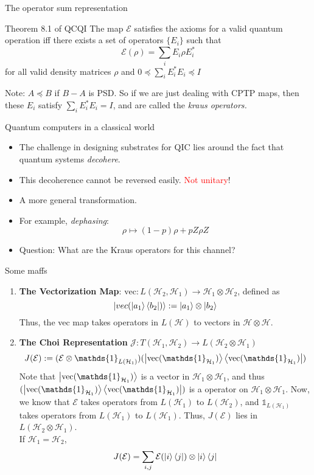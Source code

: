 \documentclass[handout]{beamer}
\renewcommand{\vec}{\text{vec}}
\newcommand{\iden}{\mathds{1}}
\newcommand{\Hilb}{\mathcal{H}}
\newcommand{\E}{\mathcal{E}}
\newcommand{\J}{\mathcal{J}}
\begin{document}
\begin{frame}{The operator sum representation}
    \begin{block}{Theorem 8.1 of QCQI}
    The map $\E$ satisfies the axioms for a valid quantum operation iff there exists a set of operators $\{E_i\}$ such that  \[\E(\rho) = \sum_iE_i\rho E_i^*\]
for all valid density matrices $\rho$ and $0 \preccurlyeq\sum_iE_i^*E_i \preccurlyeq I$
    \end{block}
     Note: $A\preccurlyeq B$ if $B-A$ is PSD.
\pause
So if we are just dealing with CPTP maps, then these $E_i$ satisfy $\sum_iE_i^*E_i = I$, and are called the \textit{kraus operators.}
\end{frame}

\begin{frame}{Quantum computers in a classical world}
    \begin{itemize}
        \item The challenge in designing substrates for QIC lies around the fact that quantum systems \textit{decohere}.\pause 
        \item This decoherence cannot be reversed easily. \textcolor{red}{Not unitary}!\pause 
        \item A more general transformation. \pause 
        \item For example, \textit{dephasing}:
        \begin{equation}
            \rho \mapsto (1-p)\rho + pZ\rho Z
        \end{equation}\pause 
        \item Question: What are the Kraus operators for this channel?
    \end{itemize}
\end{frame}
\begin{frame}{Some maffs}
    \begin{enumerate}
        \item \textbf{The Vectorization Map}: $\vec:L(\Hilb_2,\Hilb_1)\to \Hilb_1\otimes\Hilb_2$, defined as 
        \[\ket{vec(\ket{a_1}\bra{b_2})}:= \ket{a_1}\otimes\ket{b_2}\]\pause 
        Thus, the vec map takes operators in $L(\Hilb)$ to vectors in $\Hilb\otimes\Hilb$.\pause 
        \item \textbf{The Choi Representation} $\J:T(\Hilb_1,\Hilb_2) \to L(\Hilb_2\otimes \Hilb_1)$ 
        \[J(\E) := (\E\otimes \iden_{L(\Hilb_1)})(\ket{\vec(\iden_{\Hilb_1})}\bra{\vec(\iden_{\Hilb_1})})\]\pause 
        Note that $\ket{\vec(\iden_{\Hilb_1})}$ is a vector in $\Hilb_1\otimes\Hilb_1$, and thus $(\ket{\vec(\iden_{\Hilb_1})}\bra{\vec(\iden_{\Hilb_1})})$ is a operator on $\Hilb_1\otimes\Hilb_1$. Now, we know that $\E$ takes operators from $L(\Hilb_1)$ to $L(\Hilb_2)$, and $\iden_{L(\Hilb_1)}$ takes operators from $L(\Hilb_1)$ to $L(\Hilb_1)$. Thus, $J(\E)$ lies in $L(\Hilb_2\otimes \Hilb_1)$.\pause \\ 
        If $\Hilb_1 = \Hilb_2$, 
        \[J(\E) = \sum_{i,j}\E(\ket{i}\bra{j}) \otimes \ket{i}\bra{j}\]
    \end{enumerate}
    
\end{frame}
\end{document}
